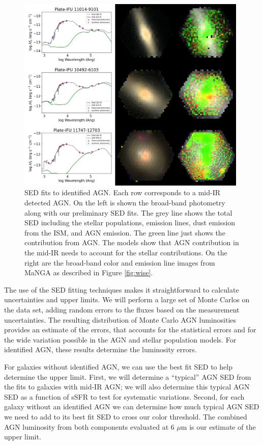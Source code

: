 \documentclass[12pt, preprint]{hacked-aastex}
\begin{document}
\begin{figure}[t!]
\includegraphics[width=0.98\textwidth]{spec-grid.png}
    \caption{
\label{fig:fits} \small SED fits to identified AGN. Each row
corresponds to a mid-IR detected AGN. On the left is shown the
broad-band photometry along with our preliminary SED fits.  The grey
line shows the total SED including the stellar populations, emission
lines, dust emission from the ISM, and AGN emission. The green line
just shows the contribution from AGN. The models show that AGN
contribution in the mid-IR needs to account for the stellar
contributions. On the right are the broad-band color and emission line
images from MaNGA as described in Figure \ref{fig:wise}.}
\end{figure}

The use of the SED fitting techniques makes it straightforward to
calculate uncertainties and upper limits. We will perform a large set
of Monte Carlos on the data set, adding random errors to the fluxes
based on the measurement uncertainties. The resulting distribution of
Monte Carlo AGN luminosities provides an estimate of the errors, that
accounts for the statistical errors and for the wide variation
possible in the AGN and stellar population models. For identified AGN,
these results determine the luminosity errors.

For galaxies without identified AGN, we can use the best fit SED to
help determine the upper limit. First, we will determine a ``typical''
AGN SED from the fits to galaxies with mid-IR AGN; we will also
determine this typical AGN SED as a function of sSFR to test for
systematic variations. Second, for each galaxy without an identified
AGN we can determine how much typical AGN SED we need to add to its
best fit SED to cross our color threshold. The combined AGN luminosity
from both components evaluated at 6 $\mu$m is our estimate of the
upper limit.
\end{document}
